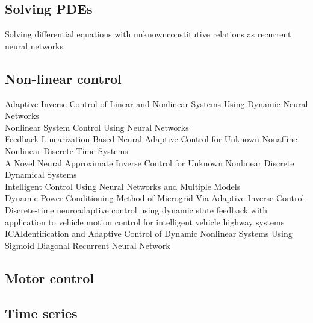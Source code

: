 \documentclass{article}
\begin{document}
\subsection{Solving PDEs}
Solving differential equations with unknownconstitutive relations as recurrent neural networks \\

\subsection{Non-linear control}
Adaptive Inverse Control of Linear and Nonlinear Systems Using Dynamic Neural Networks \\
Nonlinear System Control Using Neural Networks \\
Feedback-Linearization-Based Neural Adaptive Control for Unknown Nonaffine Nonlinear Discrete-Time Systems \\
A Novel Neural Approximate Inverse Control for Unknown Nonlinear Discrete Dynamical Systems \\
Intelligent Control Using Neural Networks and Multiple Models \\
Dynamic Power Conditioning Method of Microgrid Via Adaptive Inverse Control \\
Discrete-time neuroadaptive control using dynamic state feedback with application to vehicle motion control for intelligent vehicle highway systems \\
ICAIdentification and Adaptive Control of Dynamic Nonlinear Systems Using Sigmoid Diagonal Recurrent Neural Network \\

\subsection{Motor control}
\subsection{Time series}
\end{document}
